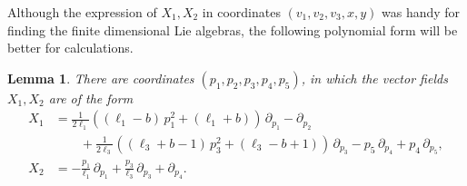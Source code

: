 \documentclass{amsart}
\theoremstyle{plain}
\newtheorem{lemma}[theorem]{Lemma}
\theoremstyle{definition}
\newtheorem*{example}{Example}
\theoremstyle{remark}
\newcommand{\mfk}[1]{\mathfrak{#1}}
\begin{document}
%
Although the expression of $X_1, X_2$ in coordinates $(v_1, v_2, v_3, x, y)$ was handy for finding the finite dimensional Lie algebras, the following polynomial form will be better for calculations.
\begin{lemma}
    There are coordinates $(p_1, p_2, p_3, p_4, p_5)$, in which the vector fields $X_1, X_2$ are of the form
    \begin{equation}\label{polynomial_generators}
    \begin{aligned}
        X_1 &= \frac{1}{2 \ell_1} \left( ( \ell_1 - b)\, p_1^2 + ( \ell_1 + b) \right)\, \partial_{p_1} - \partial_{p_2}\\
         &\qquad {}+ \frac{1}{2 \ell_3} \left( (\ell_3+b-1)\, p_3^2 + (\ell_3-b+1) \right)\, \partial_{p_3} - p_5\, \partial_{p_4} + p_4\, \partial_{p_5},\\
        X_2 &= -\frac{p_1}{\ell_1}\, \partial_{p_1} + \frac{p_3}{\ell_3}\, \partial_{p_3} + \partial_{p_4}.
    \end{aligned}
    \end{equation}
\end{lemma}
\end{document}
